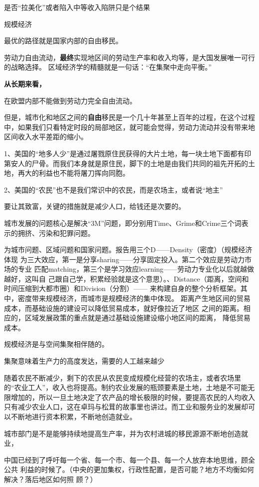是否“拉美化”或者陷入中等收入陷阱只是个结果

规模经济

最优的路径就是国家内部的自由移民。

劳动力自由流动，{\bf 最终}实现地区间的劳动生产率和收入均等，是大国发展唯一可行的战略选择。
区域经济学的精髓就是一句话：“在集聚中走向平衡。”

{\bf 从长期来看，}

在欧盟内部不能做到劳动力完全自由流动。


但是，城市化和地区之间的{\bf 自由}移民是一个几十年甚至上百年的过程，在这个过程中，如果我们只看特定时段的局部地区，就可能会觉得，劳动力流动并没有带来地区间收入水平差距的缩小。

1、美国的“地多人少”是通过屠戮原住民获得的大片土地，每一块土地下面都有印第安人的尸骨。而我们本身就是原住民，脚下的土地是由我们共同的祖先开拓的土地，再大的利益也不能将屠刀挥向同胞。

2、美国的“农民”也不是我们常识中的农民，而是农场主，或者说“地主”

要让其致富，关键的措施就是减少人口，给钱还是次要的。

城市发展的问题核心是解决“3M”问题，即分别用Time、Grime和Crime三个词表示的拥挤、污染和犯罪问题。

为城市问题、区域问题和国家问题。报告用三个D——Density（密度）（规模经济体现
为三大效应，第一是分享sharing——分享固定投入。第二个效应是劳动力市场的专业
匹配matching，第三个是学习效应learning——劳动力专业化以后就越做越好，这叫自
己跟自己学，积累经验就是这个意思）。、Distance（距离，空间和时间压缩到大都市圈）和Division（分割）——
来构建自身的整个分析框架。其中，密度带来规模经济，而城市是规模经济的集中体现。
距离产生地区间的贸易成本，而基础设施的建设可以降低贸易成本，就好像拉近了地区
之间的距离。相应的，区域发展政策的重点就是通过基础设施建设缩小地区间的距离，
降低贸易成本。

规模经济是与空间集聚相伴随的。

集聚意味着生产力的高度发达，需要的人工越来越少

随着农民不断减少，剩下的农民从农民变成规模化经营的农场主，或者农场里的“农业工人”，收入也将提高。制约农业发展的瓶颈要素是土地，土地是不可能无限增加的，所以一旦土地决定了农产品的增长极限的时候，要提高农民的人均收入只有减少农业人口，这在卓玛与松茸的故事里也讲过。而工业和服务业的发展却可以不断地进行资本积累，不断地创造就业。

城市部门是不是能够持续地提高生产率，并为农村进城的移民源源不断地创造就业，


中国已经到了呼吁每一个省、每一个市、每一个县、每一个人放弃本地思维，顾全公共
利益的时候了。（中央的更加集权，行政性配置，是否可能？地方不均衡如何解决？落后地区如何照
顾？）

